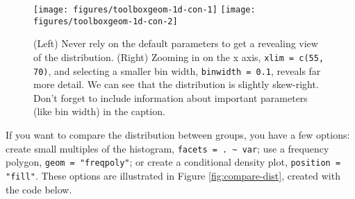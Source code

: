 \begin{figure}

{\centering \texttt{[image: figures/toolboxgeom-1d-con-1]} \texttt{[image: figures/toolboxgeom-1d-con-2]} 

}

\caption{(Left) Never rely on the default parameters to get a revealing view of the distribution.  (Right) Zooming in on the x axis, \texttt{xlim = c(55, 70)}, and selecting a smaller bin width, \texttt{binwidth = 0.1}, reveals far more detail. We can see that the distribution is slightly skew-right. Don't forget to include information about important parameters (like bin width) in the caption.\label{fig:geom-1d-con}}
\end{figure}

If you want to compare the distribution between groups, you have a few
options: create small multiples of the histogram,
\texttt{facets = . \textasciitilde{} var}; use a frequency polygon,
\texttt{geom = "freqpoly"}; or create a conditional density plot,
\texttt{position = "fill"}. These options are illustrated in Figure
\ref{fig:compare-dist}, created with the code below.
 
 

\begin{Shaded}
\begin{Highlighting}[]
\StringTok{ }\StringTok{ }\NormalTok{(}\NormalTok{, }\NormalTok{)}
\StringTok{ }
\StringTok{  }\NormalTok{(}\NormalTok{(}  \NormalTok{) +}
\StringTok{  }\StringTok{ }
\StringTok{ }\NormalTok{(}\NormalTok{(}  \NormalTok{, }
   \NormalTok{)}
\StringTok{ }\NormalTok{(}\NormalTok{(}  
   \NormalTok{) }
\end{Highlighting}
\end{Shaded}

